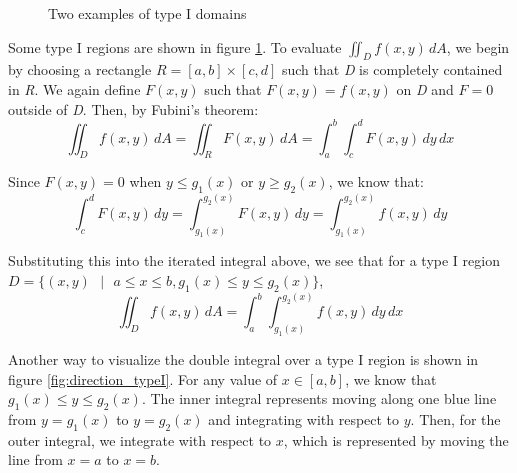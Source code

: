 \begin{figure}[htbp]
    \begin{minipage}{0.5\textwidth}
    \end{minipage}
    \caption{Two examples of type I domains}
    \label{fig:type1}
\end{figure}

Some type I regions are shown in figure \ref{fig:type1}. To evaluate $\iint_{
\textit{D}} f(x,y)\,dA$, we begin by choosing a rectangle $\textit{R} = \left[ 
a, b \right] \times \left[ c, d \right]$ such that \textit{D} is completely 
contained in \textit{R}. We again define $F(x, y)$ such that $F(x, y) = f(x,y)$
on \textit{D} and $F = 0$ outside of \textit{D}. Then, by Fubini's theorem:
$$\iint_{\textit{D}} f(x, y)\,dA = \iint_{\textit{R}} F(x, y)\,dA = \int_a^b 
\int_c^d F(x, y)\,dy\,dx$$

Since $F(x, y) = 0$ when $y \leq g_1(x)$ or $y \geq g_2(x)$, we know that:
$$\int_c^d F(x, y)\,dy = \int_{g_1(x)}^{g_2(x)} F(x, y)\,dy = \int_{g_1(x)}^{
g_2(x)} f(x, y)\,dy$$

Substituting this into the iterated integral above, we see that for a type I 
region $\textit{D} = \{ (x, y) \text{ } | \text{ } a \leq x \leq b, g_1(x) 
\leq y \leq g_2(x) \}$, 
$$\iint_{\textit{D}} f(x, y)\,dA = \int_a^b \int_{g_1(x)}^{g_2(x)} f(x, y)
\,dy\,dx$$

Another way to visualize the double integral over a type I region is shown in 
figure \ref{fig:direction_typeI}. For any value of $x \in \left[ a, b 
\right]$, we know that $g_1(x) \leq y \leq g_2(x)$. The inner integral 
represents moving along one blue line from $y = g_1(x)$ to $y = g_2(x)$ and 
integrating with respect to $y$. Then, for the outer integral, we integrate 
with respect to $x$, which is represented by moving the line from $x = a$ to 
$x = b$. 

